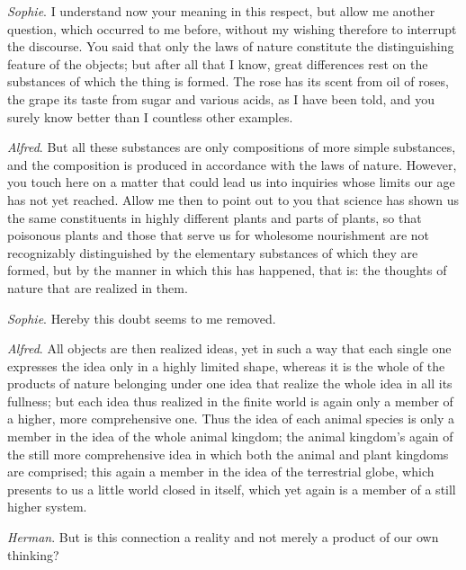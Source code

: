 \documentclass[12pt,a4paper,openany]{book}
\newcommand{\opage}[1]{\marginnote{\footnotesize\textit{[#1]}}}
\begin{document}
\emph{Sophie}. I understand now your meaning in this respect, but allow me another
question, which occurred to me before, without my wishing therefore to interrupt the
discourse. You said that only the laws of nature constitute the distinguishing
feature of the objects; but after all that I know, great differences rest on the
substances of which the thing is formed. The rose has its scent from oil of roses,
the grape its taste from sugar and various acids, as I have been told, and you
surely know better than I countless other examples.

\emph{Alfred}. But all these substances are only compositions of more simple
substances, and the composition is produced
\setcounter{footnote}{0}%
\opage{66}in accordance with the laws of nature. However, you touch here on a matter that
could lead us into inquiries whose limits our age has not yet reached. Allow me then
to point out to you that science has shown us the same constituents in highly
different plants and parts of plants, so that poisonous plants and those that serve
us for wholesome nourishment are not recognizably distinguished by the elementary
substances of which they are formed, but by the manner in which this has happened,
that is: the thoughts of nature that are realized in them.

\emph{Sophie}. Hereby this doubt seems to me removed.

\emph{Alfred}. All objects are then realized ideas, yet in such a way that each
single one expresses the idea only in a highly limited shape, whereas it is the
whole of the products of nature belonging under one idea that realize the whole idea
in all its fullness; but each idea thus realized in the finite world is again only a
member of a higher, more comprehensive one. Thus the idea of each animal species is
only a member in the idea of the whole animal kingdom; the animal kingdom's again of
the still more comprehensive idea in which both the animal and plant kingdoms are
comprised; this again a member in the idea of the terrestrial globe, which presents
to us a little world closed in itself, which yet again is a member of a still higher
system.

\emph{Herman}. But is this connection a reality and not merely a product of our own
thinking?
\end{document}
